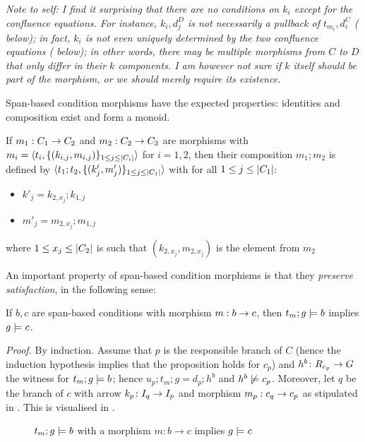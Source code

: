 \medskip\noindent
\emph{Note to self: I find it surprising that there are no conditions on $k_i$ except for the confluence equations. For instance, $k_i,d_j^D$ is \emph{not} necessarily a pullback of $t_{m_i},d_i^C$ ( below); in fact, $k_i$ is \emph{not even} uniquely determined by the two confluence equations ( below); in other words, there may be multiple morphisms from $C$ to $D$ that only differ in their $k$ components. I am however not sure if $k$ itself should be part of the morphism, or we should merely require its existence.}

\medskip\noindent Span-based condition morphisms have the expected properties: identities and composition exist and form a monoid.

\begin{definition}
\end{definition}

\begin{definition}
  If $m_1:C_1\rightarrow C_2$ and $m_2:C_2\rightarrow C_3$ are morphisms with $m_i=\langle{t_i,\{{(k_{i,j},m_{i,j})}\}_{1\leq j\leq |{C_i}|}}\rangle$ for $i=1,2$, then their composition $m_1;m_2$ is defined by $\langle{t_1;t_2,\{{(k'_j,m'_j)}\}_{1\leq j\leq |{C_1}|}}\rangle$ with for all $1\leq j\leq |{C_1}|$:
  \begin{itemize}
  \item $k'_j=k_{2,x_j};k_{1,j}$
  \item $m'_j=m_{2,x_j};m_{1,j}$
  \end{itemize}
  where $1\leq x_j\leq |{C_2}|$ is such that $(k_{2,x_j},m_{2,x_j})$ is the element from $m_2$ 
\end{definition}

\begin{proposition}
\end{proposition}

\medskip\noindent An important property of span-based condition morphisms is that they \emph{preserve satisfaction}, in the following sense:
%
\begin{proposition}
If $b,c$ are span-based conditions with morphism $m:b\rightarrow c$, then $t_m;g\models b$ implies $g\models c$.
\end{proposition}
%
\emph{Proof.} By induction. Assume that $p$ is the responsible branch of $C$ (hence the induction hypothesis implies that the proposition holds for $c_p$) and $h^b\colon R_{c_p}\rightarrow G$ the witness for $t_m;g\models b$; hence $u_p;t_m;g=d_p;h^b$ and $h^b\not\models c_p$. Moreover, let $q$ be the branch of $c$ with arrow $k_p\colon I_q\rightarrow I_p$ and morphism $m_p:c_q\rightarrow c_p$ as stipulated in . This is visualised in .
%
\begin{figure}
  \centering
  
  \caption{$t_m;g\models b$ with a morphism $m:b\rightarrow c$ implies $g\models c$}
\end{figure}

